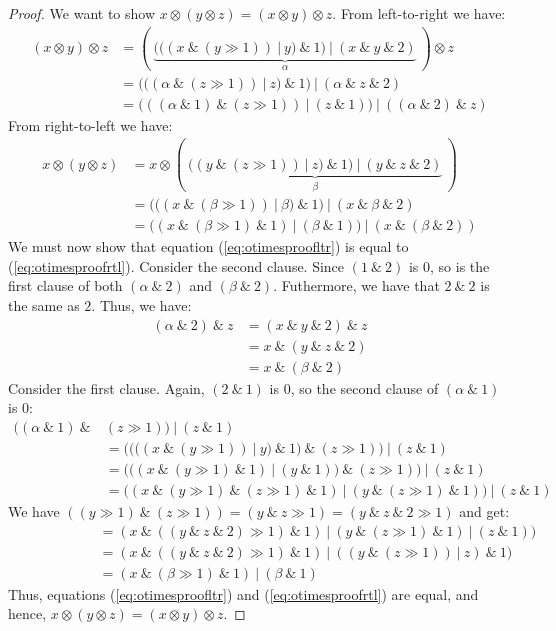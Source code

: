 \begin{proof}
  We want to show $x \otimes (y \otimes z) = (x \otimes y) \otimes z$. From left-to-right we have:
\begin{align}
  (x \otimes y) \otimes z &= (~\underbrace{(((x~\&~(y \gg 1))~|~y)~\&~1)~|~(x~\&~y~\&~2)}_{\alpha}~) \otimes z\\
              &= (((\alpha~\&~(z \gg 1))~|~z)~\&~1)~|~(\alpha~\&~z~\&~2)\\
              \label{eq:otimesproofltr}
              &= (((\alpha~\&~1)~\&~(z \gg 1))~|~(z~\&~1))~|~((\alpha~\&~2)~\&~z)
\end{align}
From right-to-left we have:
\begin{align}
  x \otimes (y \otimes z) &= x \otimes (~\underbrace{((y~\&~(z \gg 1))~|~z)~\&~1)~|~(y~\&~z~\&~2)}_{\beta}~)\\
  &= (((x~\&~(\beta \gg 1))~|~\beta)~\&~1)~|~(x~\&~\beta~\&~2)\\
  \label{eq:otimesproofrtl}
  &= ((x~\&~(\beta \gg 1)~\&~1)~|~(\beta~\&~1))~|~(x~\&~(\beta~\&~2))
\end{align}
We must now show that equation (\ref{eq:otimesproofltr}) is equal to
(\ref{eq:otimesproofrtl}). Consider the second clause. Since $(1~\&~2)$ is $0$,
so is the first clause of both $(\alpha~\&~2)$ and $(\beta~\&~2)$. Futhermore, we have
that $2~\&~2$ is the same as $2$. Thus, we have:
\begin{align}
  (\alpha~\&~2)~\&~z &= (x~\&~y~\&~2)~\&~z\\
                &= x~\&~(y~\&~z~\&~2)\\
                &= x~\&~(\beta~\&~2)
\end{align}
Consider the first clause. Again, $(2~\&~1)$ is $0$, so the second clause of $(\alpha~\&~1)$ is $0$:
\begin{align}
  ((\alpha~\&~1)~\&~&(z \gg 1))~|~(z~\&~1) \\
               &= ((((x~\&~(y \gg 1))~|~y)~\&~1)~\&~(z \gg 1))~|~(z~\&~1) \\
               &= (((x~\&~(y \gg 1)~\&~1)~|~(y~\&~1))~\&~(z \gg 1))~|~(z~\&~1) \\
               &= ((x~\&~(y \gg 1)~\&~(z \gg 1)~\&~1)~|~(y~\&~(z \gg 1)~\&~1))~|~(z~\&~1)
\end{align}
We have $((y \gg 1)~\&~(z \gg 1)) = (y~\&~z \gg 1) = (y~\&~z~\&~2 \gg 1)$ and get:
\begin{align}
  &= (x~\&~((y~\&~z~\&~2) \gg 1)~\&~1)~|~(y~\&~(z \gg 1)~\&~1)~|~(z~\&~1))\\
  \phantom{((\alpha~\&~1)\&}&= (x~\&~((y~\&~z~\&~2) \gg 1)~\&~1)~|~((y~\&~(z \gg 1))~|~z)~\&~1)\\
  &= (x~\&~(\beta \gg 1)~\&~1)~|~(\beta~\&~1)
\end{align}
Thus, equations (\ref{eq:otimesproofltr}) and (\ref{eq:otimesproofrtl}) are equal, and hence, $x \otimes (y \otimes z) = (x \otimes y) \otimes z$.
\end{proof}




